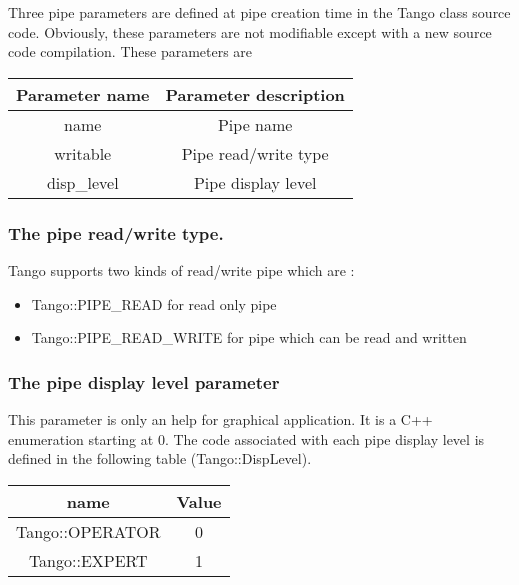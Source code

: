Three pipe parameters are defined at pipe creation time
in the Tango class source code. Obviously, these parameters are not
modifiable except with a new source code compilation. These parameters
are 

\vspace{0.3cm}

\begin{center}
\begin{longtable}{|c|c|}
\hline 
Parameter name & Parameter description\tabularnewline
\hline 
\hline 
name & Pipe name\tabularnewline
\hline 
writable\index{writable} & Pipe read/write type\tabularnewline
\hline 
disp\_level\index{disp_level@disp\_level} & Pipe display level\tabularnewline
\hline 
\end{longtable}
\par\end{center}

\subsubsection{The pipe read/write type. }

Tango supports two kinds of read/write pipe which are :
\begin{itemize}
\item Tango::PIPE\_READ for read only pipe
\item Tango::PIPE\_READ\_WRITE for pipe which can be
read and written
\end{itemize}

\subsubsection{The pipe display level parameter}

This parameter is only an help for graphical application. It is a
C++ enumeration starting at 0. The code associated with each pipe
display level is defined in the following table (Tango::DispLevel).

\vspace{0.3cm}

\begin{center}
\begin{longtable}{|c|c|}
\hline 
name & Value\tabularnewline
\hline 
\hline 
Tango::OPERATOR & 0\tabularnewline
\hline 
Tango::EXPERT & 1\tabularnewline
\hline 
\end{longtable}
\par\end{center}

